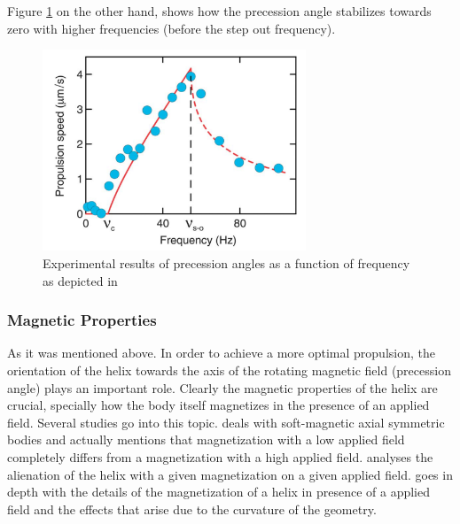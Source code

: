 Figure \ref{fig:Morozov2014b} on the other hand, shows how the precession angle stabilizes towards zero with higher frequencies (before the step out frequency).\\

\begin{figure}[ht]
	\centering
  \includegraphics[width=0.7\textwidth]{Pictures/Morozov2014b.png}
	\caption{Experimental results of precession angles as a function of frequency as depicted in \cite{Morozov2014}}
	\label{fig:Morozov2014b}
\end{figure}

\subsubsection{Magnetic Properties}

As it was mentioned above. In order to achieve a more optimal propulsion, the orientation of the helix towards the axis of the rotating magnetic field (precession angle) plays an important role. Clearly the magnetic properties of the helix are crucial, specially how the body itself magnetizes in the presence of an applied field. Several studies go into this topic. \cite{Abbott2007} deals with soft-magnetic axial symmetric bodies and actually mentions that magnetization with a low applied field completely differs from a magnetization with a high applied field. \cite{Morozov2014a} analyses the alienation of the helix with a given magnetization on a given applied field. \cite{Sheka2015} goes in depth with the details of the magnetization of a helix in presence of a applied field and the effects that arise due to the curvature of the geometry.






